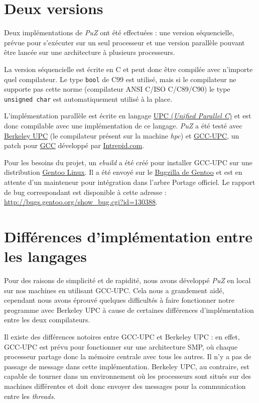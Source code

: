 \documentclass[a4paper,11pt]{report}
\newcommand{\ensp}[1]{\selectlanguage{english}#1\selectlanguage{french}}
\newcommand{\type}[1]{\ensp{\texttt{#1}}}
\newcommand{\puz}{\emph{PuZ}}
\begin{document}
\section{Deux versions}

Deux implémentations de \puz{} ont été effectuées : une version séquencielle,
prévue pour s'exécuter sur un seul processeur et une version parallèle
pouvant être lancée sur une architecture à plusieurs processeurs.

La version séquencielle est écrite en C et peut donc être compilée avec
n'importe quel compilateur. Le type \type{bool} de C99 est utilisé, mais si le
compilateur ne supporte pas cette norme (compilateur ANSI C/ISO C/C89/C90) le
type \type{unsigned char} est automatiquement utilisé à la place.

L'implémentation parallèle est écrite en langage
\href{http://upc.gwu.edu/}{UPC (\emph{Unified Parallel C})} et est donc
compilable avec une implémentation de ce langage. \puz{} a été testé avec
\href{http://upc.nersc.gov/}{Berkeley UPC} (le compilateur présent sur la
machine \emph{hpc}) et \href{http://www.intrepid.com/upc/}{GCC-UPC}, un patch
pour \href{http://gcc.gnu.org/}{GCC} développé par
\href{http://www.intrepid.com/}{Intrepid.com}.

Pour les besoins du projet, un \emph{ebuild} a été créé pour installer GCC-UPC
sur une distribution \href{http://www.gentoo.org/}{Gentoo Linux}. Il a été
envoyé sur le \href{http://bugs.gentoo.org/}{Bugzilla de Gentoo} et est en
attente d'un mainteneur pour intégration dans l'arbre Portage officiel. Le
rapport de bug correspondant est disponible à cette adresse :
\href{http://bugs.gentoo.org/show_bug.cgi?id=130388}
{\sffamily\ensp{http://bugs.gentoo.org/show\_bug.cgi?id=130388}}.

\section{Différences d'implémentation entre les langages}

Pour des raisons de simplicité et de rapidité, nous avons développé \puz{} en
local sur nos machines en utilisant GCC-UPC. Cela nous a grandement aidé,
cependant nous avons éprouvé quelques difficultés à faire fonctionner notre
programme avec Berkeley UPC à cause de certaines différences d'implémentation
entre les deux compilateurs.

Il existe des différences notoires entre GCC-UPC et Berkeley UPC : en effet,
GCC-UPC est prévu pour fonctionner sur une architecture SMP, où chaque
processeur partage donc la mémoire centrale avec tous les autres. Il n'y a pas
de passage de message dans cette implémentation. Berkeley UPC, au contraire,
est capable de tourner dans un environnement où les processeurs sont situés
sur des machines différentes et doit donc envoyer des messages pour la
communication entre les \emph{threads}.
\end{document}
